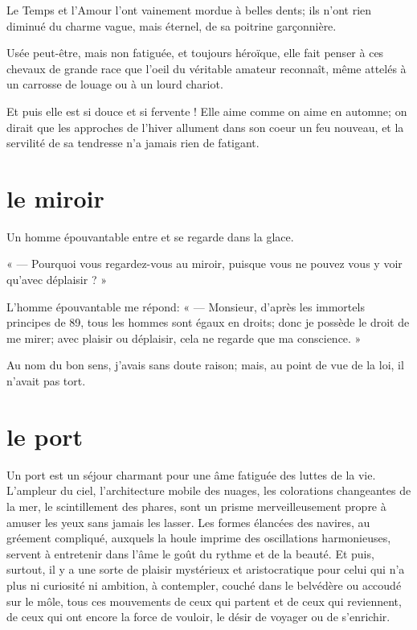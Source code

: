 Le Temps et l’Amour l’ont vainement
mordue à belles dents; ils n’ont rien diminué du
charme vague, mais éternel, de sa poitrine garçonnière.

Usée peut{}-être, mais non fatiguée, et toujours héroïque, elle fait
penser à ces chevaux de grande race que l’oeil du
véritable amateur reconnaît, même attelés à un carrosse de louage ou à
un lourd chariot.

Et puis elle est si douce et si fervente ! Elle aime comme on aime en
automne; on dirait que les approches de l’hiver
allument dans son coeur un feu nouveau, et la servilité de sa tendresse
n’a jamais rien de fatigant.

\quebra\section[Le miroir]{le miroir}

Un homme épouvantable entre et se regarde dans la glace.

« --- Pourquoi vous regardez{}-vous au miroir, puisque vous ne pouvez vous
y voir qu’avec déplaisir ? »

L’homme épouvantable me répond: « --- Monsieur,
d’après les immortels principes de 89, tous les hommes
sont égaux en droits; donc je possède le droit de me mirer; avec
plaisir ou déplaisir, cela ne regarde que ma conscience. »

Au nom du bon sens, j’avais sans doute raison; mais, au
point de vue de la loi, il n’avait pas tort.

\quebra\section[Le port]{le port }

Un port est un séjour charmant pour une âme fatiguée des luttes de la
vie. L’ampleur du ciel,
l’architecture mobile des nuages, les colorations
changeantes de la mer, le scintillement des phares, sont un prisme
merveilleusement propre à amuser les yeux sans jamais les lasser. Les
formes élancées des navires, au gréement compliqué, auxquels la houle
imprime des oscillations harmonieuses, servent à entretenir dans
l’âme le goût du rythme et de la beauté. Et puis,
surtout, il y a une sorte de plaisir mystérieux et aristocratique pour
celui qui n’a plus ni curiosité ni ambition, à
contempler, couché dans le belvédère ou accoudé sur le môle, tous ces
mouvements de ceux qui partent et de ceux qui reviennent, de ceux qui
ont encore la force de vouloir, le désir de voyager ou de
s’enrichir.

